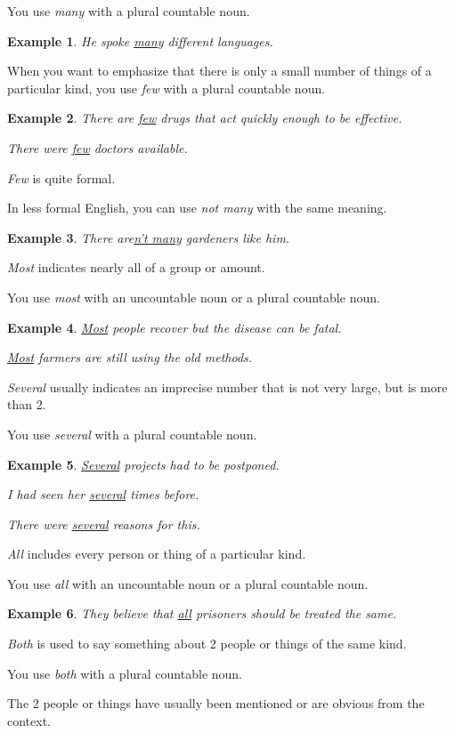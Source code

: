 \documentclass[oneside]{book}
\numberwithin{equation}{section}
\newtheorem{example}{Example}[section]
\begin{document}
You use \textit{many} with a plural countable noun.
\begin{example}
    He spoke \underline{many} different languages.
\end{example}
When you want to emphasize that there is only a small number of things of a particular kind, you use \textit{few} with a plural countable noun.
\begin{example}
    There are \underline{few} drugs that act quickly enough to be effective.
    
    There were \underline{few} doctors available.
\end{example}
\textit{Few} is quite formal.

In less formal English, you can use \textit{not many} with the same meaning.
\begin{example}
    There are\underline{n't many} gardeners like him.
\end{example}
\textit{Most} indicates nearly all of a group or amount.

You use \textit{most} with an uncountable noun or a plural countable noun.
\begin{example}
    \underline{Most} people recover but the disease can be fatal.
    
    \underline{Most} farmers are still using the old methods.
\end{example}
\textit{Several} usually indicates an imprecise number that is not very large, but is more than 2.

You use \textit{several} with a plural countable noun.
\begin{example}
    \underline{Several} projects had to be postponed.
    
    I had seen her \underline{several} times before.
    
    There were \underline{several} reasons for this.
\end{example}
%
\noindent{} \textit{All} includes every person or thing of a particular kind.

You use \textit{all} with an uncountable noun or a plural countable noun.
\begin{example}
    They believe that \underline{all} prisoners should be treated the same.
\end{example}
\textit{Both} is used to say something about 2 people or things of the same kind.

You use \textit{both} with a plural countable noun.

The 2 people or things have usually been mentioned or are obvious from the context.
\end{document}

